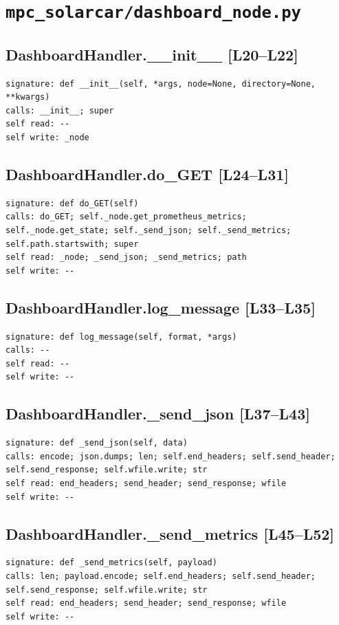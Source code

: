 \documentclass[a4paper,10pt,oneside]{book}
\begin{document}
\section{\texttt{mpc\_solarcar/dashboard\_node.py}}
\subsection*{DashboardHandler.\_\_init\_\_ [L20--L22]}
\begin{lstlisting}[numbers=none]
signature: def __init__(self, *args, node=None, directory=None, **kwargs)
calls: __init__; super
self read: --
self write: _node
\end{lstlisting}
\subsection*{DashboardHandler.do\_GET [L24--L31]}
\begin{lstlisting}[numbers=none]
signature: def do_GET(self)
calls: do_GET; self._node.get_prometheus_metrics; self._node.get_state; self._send_json; self._send_metrics; self.path.startswith; super
self read: _node; _send_json; _send_metrics; path
self write: --
\end{lstlisting}
\subsection*{DashboardHandler.log\_message [L33--L35]}
\begin{lstlisting}[numbers=none]
signature: def log_message(self, format, *args)
calls: --
self read: --
self write: --
\end{lstlisting}
\subsection*{DashboardHandler.\_send\_json [L37--L43]}
\begin{lstlisting}[numbers=none]
signature: def _send_json(self, data)
calls: encode; json.dumps; len; self.end_headers; self.send_header; self.send_response; self.wfile.write; str
self read: end_headers; send_header; send_response; wfile
self write: --
\end{lstlisting}
\subsection*{DashboardHandler.\_send\_metrics [L45--L52]}
\begin{lstlisting}[numbers=none]
signature: def _send_metrics(self, payload)
calls: len; payload.encode; self.end_headers; self.send_header; self.send_response; self.wfile.write; str
self read: end_headers; send_header; send_response; wfile
self write: --
\end{lstlisting}
\end{document}
